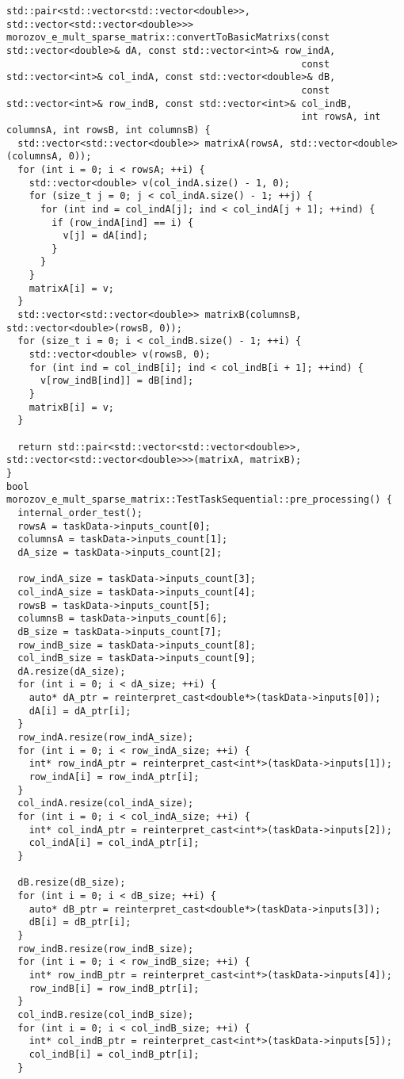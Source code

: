 \documentclass[a4paper,12pt]{article}
\begin{document}
\begin{lstlisting}
std::pair<std::vector<std::vector<double>>, std::vector<std::vector<double>>>
morozov_e_mult_sparse_matrix::convertToBasicMatrixs(const std::vector<double>& dA, const std::vector<int>& row_indA,
                                                    const std::vector<int>& col_indA, const std::vector<double>& dB,
                                                    const std::vector<int>& row_indB, const std::vector<int>& col_indB,
                                                    int rowsA, int columnsA, int rowsB, int columnsB) {
  std::vector<std::vector<double>> matrixA(rowsA, std::vector<double>(columnsA, 0));
  for (int i = 0; i < rowsA; ++i) {
    std::vector<double> v(col_indA.size() - 1, 0);
    for (size_t j = 0; j < col_indA.size() - 1; ++j) {
      for (int ind = col_indA[j]; ind < col_indA[j + 1]; ++ind) {
        if (row_indA[ind] == i) {
          v[j] = dA[ind];
        }
      }
    }
    matrixA[i] = v;
  }
  std::vector<std::vector<double>> matrixB(columnsB, std::vector<double>(rowsB, 0));
  for (size_t i = 0; i < col_indB.size() - 1; ++i) {
    std::vector<double> v(rowsB, 0);
    for (int ind = col_indB[i]; ind < col_indB[i + 1]; ++ind) {
      v[row_indB[ind]] = dB[ind];
    }
    matrixB[i] = v;
  }

  return std::pair<std::vector<std::vector<double>>, std::vector<std::vector<double>>>(matrixA, matrixB);
}
bool morozov_e_mult_sparse_matrix::TestTaskSequential::pre_processing() {
  internal_order_test();
  rowsA = taskData->inputs_count[0];
  columnsA = taskData->inputs_count[1];
  dA_size = taskData->inputs_count[2];

  row_indA_size = taskData->inputs_count[3];
  col_indA_size = taskData->inputs_count[4];
  rowsB = taskData->inputs_count[5];
  columnsB = taskData->inputs_count[6];
  dB_size = taskData->inputs_count[7];
  row_indB_size = taskData->inputs_count[8];
  col_indB_size = taskData->inputs_count[9];
  dA.resize(dA_size);
  for (int i = 0; i < dA_size; ++i) {
    auto* dA_ptr = reinterpret_cast<double*>(taskData->inputs[0]);
    dA[i] = dA_ptr[i];
  }
  row_indA.resize(row_indA_size);
  for (int i = 0; i < row_indA_size; ++i) {
    int* row_indA_ptr = reinterpret_cast<int*>(taskData->inputs[1]);
    row_indA[i] = row_indA_ptr[i];
  }
  col_indA.resize(col_indA_size);
  for (int i = 0; i < col_indA_size; ++i) {
    int* col_indA_ptr = reinterpret_cast<int*>(taskData->inputs[2]);
    col_indA[i] = col_indA_ptr[i];
  }

  dB.resize(dB_size);
  for (int i = 0; i < dB_size; ++i) {
    auto* dB_ptr = reinterpret_cast<double*>(taskData->inputs[3]);
    dB[i] = dB_ptr[i];
  }
  row_indB.resize(row_indB_size);
  for (int i = 0; i < row_indB_size; ++i) {
    int* row_indB_ptr = reinterpret_cast<int*>(taskData->inputs[4]);
    row_indB[i] = row_indB_ptr[i];
  }
  col_indB.resize(col_indB_size);
  for (int i = 0; i < col_indB_size; ++i) {
    int* col_indB_ptr = reinterpret_cast<int*>(taskData->inputs[5]);
    col_indB[i] = col_indB_ptr[i];
  }


\end{lstlisting}
\end{document}
